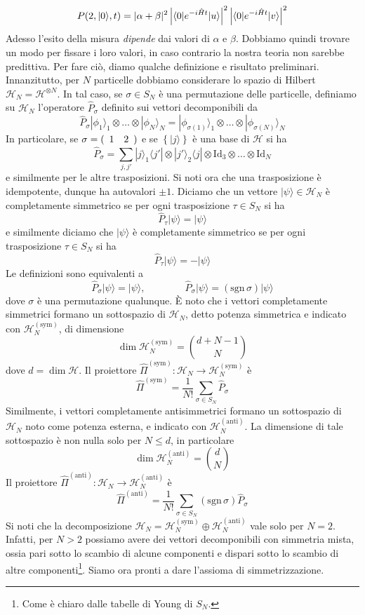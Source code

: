 \documentclass[a4paper, 11pt]{article}
\newcommand{\op}[1]{\hat{#1}}
\renewcommand{\H}{\mathcal{H}}
\newcommand{\id}{\mathrm{Id}}
\renewcommand{\op}[1]{\hat{#1}}
\newcommand{\ham}{\hat{H}}
\renewcommand{\ket}[1]{| #1\rangle}
\renewcommand{\bra}[1]{\langle #1|}
\begin{document}
\[P(2,\ket{0},t)=|\alpha+\beta|^2\left|\braketop{0}{e^{-i\ham t}}{u}
\right|^2\left|\braketop{0}{e^{-i\ham t}}{v}
\right|^2\]
Adesso l'esito della misura \emph{dipende} dai valori di $\alpha$ e $\beta$. Dobbiamo quindi trovare un modo per fissare i loro valori, in caso contrario la nostra teoria non sarebbe predittiva. Per fare ciò, diamo qualche definizione e risultato preliminari. Innanzitutto, per $N$ particelle dobbiamo considerare lo spazio di Hilbert $\H_N=\H^{\otimes N}$. In tal caso, se $\sigma\in S_N$ è una permutazione delle particelle, definiamo su $\H_N$ l'operatore $\op P_\sigma$ definito sui vettori decomponibili da
\[\op P_\sigma\ket{\phi_1}_1\otimes\ldots\otimes\ket{\phi_N}_N=\ket{\phi_{\sigma(1)}}_1\otimes\ldots\otimes\ket{\phi_{\sigma(N)}}_N\]
In particolare, se $\sigma=(\begin{array}{c c}
1&2
\end{array})$ e se $\left\{\ket{j}\right\}$ è una base di $\H$ si ha
\[\op P_\sigma=\sum_{j,j'}\ket{j}_1\bra{j'}\otimes\ket{j'}_2\bra{j}\otimes\id_3\otimes\ldots\otimes\id_N\]
e similmente per le altre trasposizioni. Si noti ora che una trasposizione è idempotente, dunque ha autovalori $\pm1$. Diciamo che un vettore $\ket{\psi}\in\H_N$ è completamente simmetrico se per ogni trasposizione $\tau\in S_N$ si ha
\[\op{P}_\tau\ket{\psi}=\ket{\psi}\]
e similmente diciamo che $\ket{\psi}$ è completamente simmetrico se per ogni trasposizione $\tau\in S_N$ si ha
\[\op{P}_\tau\ket{\psi}=-\ket{\psi}\]
Le definizioni sono equivalenti a
\[\op{P}_\sigma\ket{\psi}=\ket{\psi},\qquad\qquad\op{P}_\sigma\ket{\psi}=(\mathrm{sgn}\,\sigma)\ket{\psi}\]
dove $\sigma$ è una permutazione qualunque. \`{E} noto che i vettori completamente simmetrici formano un sottospazio di $\H_N$, detto potenza simmetrica e indicato con $\H_N^{(\textrm{sym})}$, di dimensione
\[\dim\H_N^{(\textrm{sym})}=\binom{d+N-1}{N}\]
dove $d=\dim\H$. Il proiettore $\op{\Pi}^{(\textrm{sym})}\colon\H_N\to\H_N^{(\textrm{sym})}$ è
\[\op{\Pi}^{(\textrm{sym})}=\frac{1}{N!}\sum_{\sigma\in S_N}\op P_\sigma\]
Similmente, i vettori completamente antisimmetrici formano un sottospazio di $\H_N$ noto come potenza esterna, e indicato con $\H_N^{(\textrm{anti})}$. La dimensione di tale sottospazio è non nulla solo per $N\leq d$, in particolare
\[\dim\H_N^{(\textrm{anti})}=\binom{d}{N}\]
Il proiettore $\op{\Pi}^{(\textrm{anti})}\colon\H_N\to\H_N^{(\textrm{anti})}$ è
\[\op{\Pi}^{(\textrm{anti})}=\frac{1}{N!}\sum_{\sigma\in S_N}(\mathrm{sgn}\,\sigma)\op P_\sigma\]
Si noti che la decomposizione $\H_N=\H_N^{(\textrm{sym})}\oplus\H_N^{(\textrm{anti})}$ vale solo per $N=2$. Infatti, per $N>2$ possiamo avere dei vettori decomponibili con simmetria mista, ossia pari sotto lo scambio di alcune componenti e dispari sotto lo scambio di altre componenti\footnote{Come è chiaro dalle tabelle di Young di $S_N$.}. Siamo ora pronti a dare l'assioma di simmetrizzazione.
\end{document}
